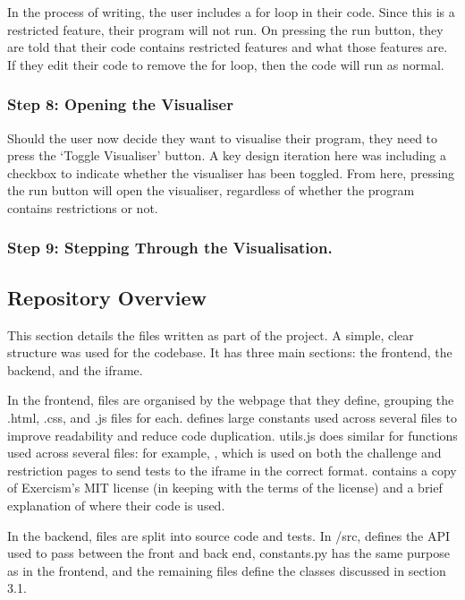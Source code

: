 In the process of writing, the user includes a for loop in their code. Since this is a restricted feature, their program will not run. On pressing the run button, they are told that their code contains restricted features and what those features are. If they edit their code to remove the for loop, then the code will run as normal.

\subsubsection{Step 8: Opening the Visualiser}

Should the user now decide they want to visualise their program, they need to press the `Toggle Visualiser' button. A key design iteration here was including a checkbox to indicate whether the visualiser has been toggled. From here, pressing the run button will open the visualiser, regardless of whether the program contains restrictions or not.

\subsubsection{Step 9: Stepping Through the Visualisation.}


\subsection{Repository Overview}

This section details the files written as part of the project. A simple, clear structure was used for the codebase. It has three main sections: the frontend, the backend, and the iframe.

In the frontend, files are organised by the webpage that they define, grouping the .html, .css, and .js files for each.  defines large constants used across several files to improve readability and reduce code duplication. utils.js does similar for functions used across several files: for example, , which is used on both the challenge and restriction pages to send tests to the iframe in the correct format.  contains a copy of Exercism's MIT license (in keeping with the terms of the license) and a brief explanation of where their code is used.

In the backend, files are split into source code and tests. In /src,  defines the API used to pass between the front and back end, constants.py has the same purpose as in the frontend, and the remaining files define the classes discussed in section 3.1.


